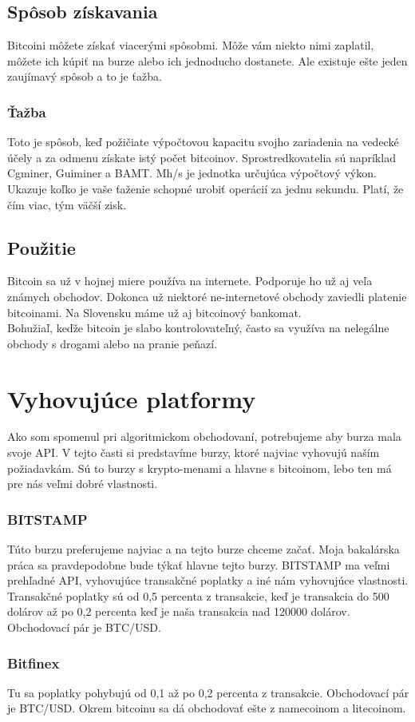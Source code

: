 \subsection{Spôsob získavania} 
Bitcoini môžete získať viacerými spôsobmi. Môže vám niekto nimi zaplatil, môžete ich kúpiť na burze alebo ich jednoducho dostanete. Ale existuje ešte jeden zaujímavý spôsob a to je ťažba. 
\subsubsection{Ťažba} 
Toto je spôsob, keď požičiate výpočtovou kapacitu svojho zariadenia na vedecké účely a za odmenu získate istý počet bitcoinov. 
 Sprostredkovatelia sú napríklad  Cgminer, Guiminer a BAMT. Mh/s je jednotka určujúca výpočtový výkon. Ukazuje koľko je vaše ťaženie schopné urobiť operácií za jednu sekundu. Platí, že čím viac, tým väčší zisk.
\subsection{Použitie} 
Bitcoin sa už v hojnej miere používa na internete. Podporuje ho už aj veľa známych obchodov. Dokonca už niektoré ne-internetové obchody zaviedli platenie bitcoinami. Na Slovensku máme už aj bitcoinový bankomat. 
 \\
Bohužiaľ, keďže bitcoin je slabo kontrolovateľný, často sa využíva na nelegálne obchody s drogami alebo na pranie peňazí. \cite{B}
\section{Vyhovujúce platformy} 
Ako som spomenul pri algoritmickom obchodovaní, potrebujeme aby burza mala svoje API. V tejto časti si predstavíme burzy, ktoré najviac vyhovujú naším požiadavkám. Sú to burzy s krypto-menami a hlavne s bitcoinom, lebo ten má pre nás veľmi dobré vlastnosti. 
\subsubsection{BITSTAMP} 
Túto burzu preferujeme najviac a na tejto burze chceme začať. Moja bakalárska práca sa pravdepodobne bude týkať hlavne tejto burzy. BITSTAMP ma veľmi prehľadné API, vyhovujúce transakčné poplatky a iné nám vyhovujúce vlastnosti. Transakčné poplatky sú od 0,5 percenta z transakcie, keď je transakcia do 500 dolárov až po 0,2 percenta keď je naša transakcia nad 120000 dolárov. Obchodovací pár je BTC/USD. \cite{Bit} 
\subsubsection{Bitfinex} 
Tu sa poplatky pohybujú od 0,1 až po 0,2 percenta z transakcie. Obchodovací pár je BTC/USD. Okrem bitcoinu sa dá obchodovať ešte z namecoinom a litecoinom. \cite{Bitf} 

